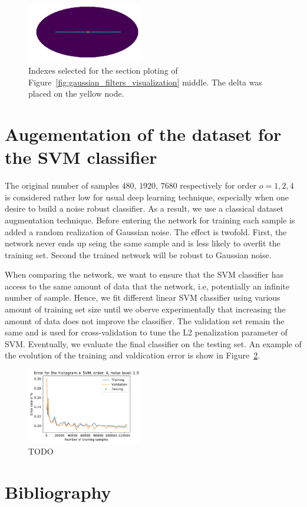\documentclass[final,twocolumn,3p,times,authoryear]{elsarticle}
\newcommand{\figref}[1]{Figure~\ref{fig:#1}}
\newcommand{\1}{\b{1}}              %
\newcommand{\0}{\b{0}}              %
\begin{document}
\begin{figure}[!ht]
\centering
\includegraphics[width=0.45\textwidth]{figures/index_plotting_order20_nside16.pdf}
\caption{Indexes selected for the section ploting of \figref{gaussian_filters_visualization} middle. The delta was placed on the yellow node.}
\label{fig:index_section}
\end{figure}

\section{Augementation of the dataset for the SVM classifier}
\label{sec:dataset_augmentation} The original number of samples $480$, $1920$,
$7680$ respectively for order $o=1,2,4$ is considered rather low for usual
deep learning technique, especially when one desire to build a noise robust
classifier. As a result, we use a classical dataset augmentation technique.
Before entering the network for training each sample is added a random
realization of Gaussian noise. The effect is twofold. First, the network never
ends up seing the same sample and is less likely to overfit the training set.
Second the trained network will be robust to Gaussian noise.

When comparing the network, we want to ensure that the SVM classifier has
access to the same amount of data that the network, i.e, potentially an
infinite number of sample. Hence, we fit different linear SVM classifier using
various amount of training set size until we oberve experimentally that
increasing the amount of data does not improve the classifier. The validation
set remain the same and is used for cross-validation to tune the L2
penalization parameter of SVM. Eventually, we evaluate the final classifier on
the testing set. An example of the evolution of the training and valdication
error is show in \figref{hist_error_evolution}.

\begin{figure}[!ht]
\centering
\includegraphics[width=0.45\textwidth]{figures/hist_error_order4_noise1_5.pdf}
\caption{TODO}
\label{fig:hist_error_evolution}
\end{figure}



\section*{Bibliography}


\end{document}
